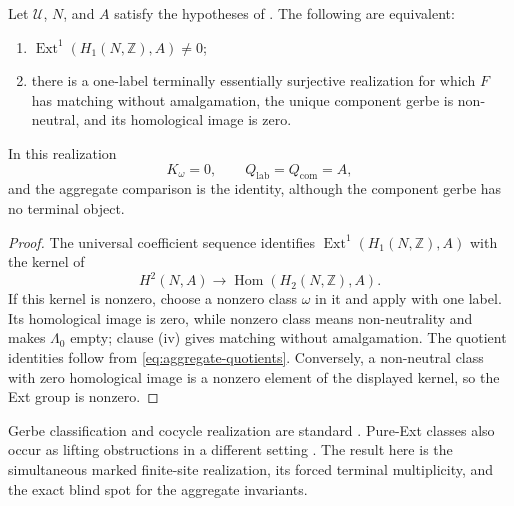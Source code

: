 \begin{corollary}
\label{cor:pure-ext-unrestricted-realization}
Let \(\mathcal U\), \(N\), and \(A\) satisfy the hypotheses of
.  The following are
equivalent:
\begin{enumerate}[label=(\roman*),nosep]
\item \(\operatorname{Ext}^1(H_1(N,\mathbb Z),A)\ne0\);
\item there is a one-label terminally essentially surjective realization for
      which \(F\) has matching without amalgamation, the unique component
      gerbe is non-neutral, and its homological image is zero.
\end{enumerate}
In this realization
\[
 K_\omega=0,
 \qquad Q_{\mathrm{lab}}=Q_{\mathrm{com}}=A,
\]
and the aggregate comparison is the identity, although the component gerbe
has no terminal object.
\end{corollary}

\begin{proof}
The universal coefficient sequence identifies
\(\operatorname{Ext}^1(H_1(N,\mathbb Z),A)\) with the kernel of
\[
 H^2(N,A)\longrightarrow
 \operatorname{Hom}(H_2(N,\mathbb Z),A).
\]
If this kernel is nonzero, choose a nonzero class \(\omega\) in it and apply
 with one label.  Its
homological image is zero, while nonzero class means non-neutrality and makes
\(\Lambda_0\) empty; clause (iv) gives matching without amalgamation.  The
quotient identities follow from \eqref{eq:aggregate-quotients}.  Conversely,
a non-neutral class with zero homological image is a nonzero element of the
displayed kernel, so the Ext group is nonzero.
\end{proof}

Gerbe classification and cocycle realization are standard
\cite[Chap.~IV]{Giraud1971}\cite{Moerdijk2002}.  Pure-Ext classes also occur
as lifting obstructions in a different setting
\cite[Sec.~7]{NeebWagemannWockel2013}.  The result here is the simultaneous
marked finite-site realization, its forced terminal multiplicity, and the
exact blind spot for the aggregate invariants.
